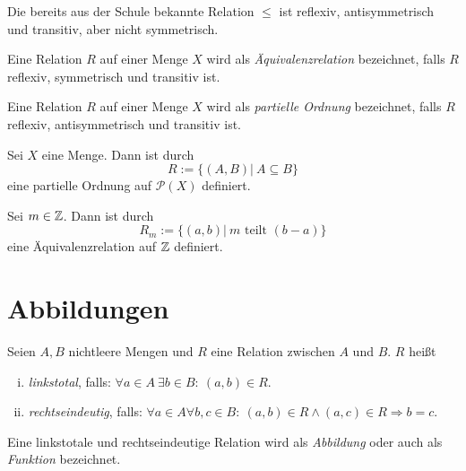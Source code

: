 \begin{example}
Die bereits aus der Schule bekannte Relation $\leq$ ist reflexiv,
antisymmetrisch und transitiv, aber nicht symmetrisch.
\end{example}


\begin{mydef}
Eine Relation $R$ auf einer Menge $X$ wird als \textit{Äquivalenzrelation}
bezeichnet, falls $R$ reflexiv, symmetrisch und transitiv ist.
\end{mydef}


\begin{mydef}
Eine Relation $R$ auf einer Menge $X$ wird als \textit{partielle Ordnung}
bezeichnet, falls $R$ reflexiv, antisymmetrisch und transitiv ist.
\end{mydef}


\begin{proposition}
Sei $X$ eine Menge.
Dann ist durch
\[
  R := \{ (A,B) | \  A \subseteq B \}
\]
eine partielle Ordnung auf $\mathcal{P}(X)$ definiert.
\end{proposition}

\begin{proof*}
\end{proof*}


\begin{proposition}
Sei $m \in \mathbb{Z}$.
Dann ist durch
\[
    R_m := \{(a,b) | \ m \text{ teilt } (b-a) \}
\]
eine Äquivalenzrelation auf $\mathbb{Z}$ definiert.
\end{proposition}

\begin{proof*}
\end{proof*}


\section{Abbildungen}

\begin{mydef}
Seien $A,B$ nichtleere Mengen und $R$ eine Relation zwischen $A$ und $B$.
$R$ heißt

\begin{enumerate}[(i)]
\item \textit{linkstotal}, falls:
$\forall a \in A \ \exists b \in B\!:\ (a,b) \in R$.

\item \textit{rechtseindeutig}, falls:
$\forall a \in A \forall b,c \in B\!:\ (a,b) \in R \wedge (a,c) \in R
\Rightarrow b = c $.
\end{enumerate}

Eine linkstotale und rechtseindeutige Relation wird als \textit{Abbildung} oder
auch als \textit{Funktion} bezeichnet.
\end{mydef}


